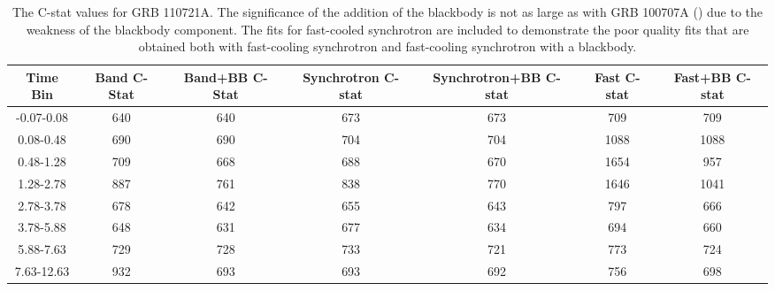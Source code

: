 \begin{table}[h!]

\centering
\scriptsize
\begin{tabular}{c | c c c c c c}



Time Bin & Band C-Stat & Band+BB C-Stat & Synchrotron C-stat & Synchrotron+BB C-stat & Fast C-stat & Fast+BB C-stat \\ 

\hline \hline

-0.07-0.08 & 640 & 640 & 673 & 673 & 709 & 709 \\ 

0.08-0.48 & 690 & 690 & 704 & 704 & 1088 & 1088 \\ 

0.48-1.28 & 709 & 668 & 688 & 670 & 1654 & 957 \\ 

1.28-2.78 & 887 & 761 & 838 & 770 & 1646 & 1041 \\ 

2.78-3.78 & 678 & 642 & 655 & 643 & 797 & 666 \\ 

3.78-5.88 & 648 & 631 & 677 & 634 & 694 & 660 \\ 

5.88-7.63 & 729 & 728 & 733 & 721 & 773 & 724 \\ 

7.63-12.63 & 932 & 693 & 693 & 692 & 756 & 698 \\ 
\end{tabular}



\caption{The C-stat values for GRB 110721A. The significance of the addition of the blackbody is not as large as with GRB 100707A () due to the weakness of the blackbody component. The fits for fast-cooled synchrotron are included to demonstrate the poor quality fits that are obtained both with fast-cooling synchrotron and fast-cooling synchrotron with a blackbody.}

\label{tab:grb2c}

\end{table}


